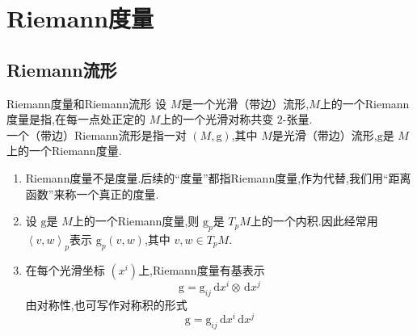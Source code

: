 \documentclass[../../几何与拓扑.tex]{subfiles}
\begin{document}
\ifSubfilesClassLoaded{
    \frontmatter

    \tableofcontents
    
    \mainmatter
}{}

    
\chapter{Riemann度量}

\section{Riemann流形}
\begin{definition}{Riemann度量和Riemann流形}
设 $ M $是一个光滑（带边）流形,$ M $上的一个Riemann度量是指,在每一点处正定的 $ M $上的一个光滑对称共变 $ 2 $-张量.\\ 
 一个（带边）Riemann流形是指一对 $ \left( M,\mathrm{g} \right)  $,其中 $ M $是光滑（带边）流形,$  \mathrm{g} $是 $ M $上的一个Riemann度量.\\ 
        
\end{definition}
\begin{remark}
    \begin{enumerate}
        \item Riemann度量不是度量.后续的“度量”都指Riemann度量,作为代替,我们用“距离函数”来称一个真正的度量.
        \item 设 $ \mathrm{g} $是 $ M $上的一个Riemann度量,则 $ \mathrm{g}_{p} $是 $ T_{p}M $上的一个内积.因此经常用 $ \left<v,w \right>_{p} $表示 $ \mathrm{g}_{p}\left( v,w \right)  $,其中 $ v,w\in T_{p}M $.
        \item 在每个光滑坐标 $ \left( x^{i} \right)  $上,Riemann度量有基表示 $$
        \mathrm{g}   = \mathrm{g}_{ij}\,\mathrm{d} x^{i}\otimes \,\mathrm{d} x^{j} 
        $$ 由对称性,也可写作对称积的形式 $$
        \mathrm{g}=\mathrm{g}_{ij}\,\mathrm{d} x^{i}\,\mathrm{d} x^{j}
        $$  
    \end{enumerate}
    
\end{remark}
\end{document}
